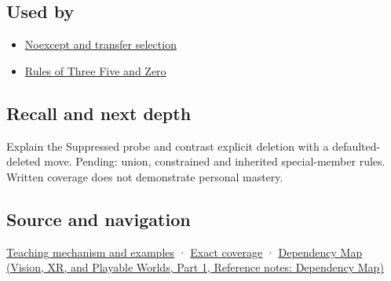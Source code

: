 \subsection{Used by}\label{appendix-42e02a12c694-used-by}

\hypertarget{appendix-42e02a12c694-used-by}{}

\begin{itemize}
\tightlist
\item
  \hyperref[appendix-c746afaa47d1]{Noexcept and transfer selection}
\item
  \hyperref[appendix-7679107d057e]{Rules of Three Five and Zero}
\end{itemize}

\subsection{Recall and next depth}\label{appendix-42e02a12c694-recall-and-next-depth}

\hypertarget{appendix-42e02a12c694-recall-and-next-depth}{}

Explain the Suppressed probe and contrast explicit deletion with a defaulted-deleted move. Pending: union, constrained and inherited special-member rules. Written coverage does not demonstrate personal mastery.

\subsection{Source and navigation}\label{appendix-42e02a12c694-source-and-navigation}

\hypertarget{appendix-42e02a12c694-source-and-navigation}{}

\hyperref[01-foundations-i-ch003-let-the-compiler-compose-the-operations]{Teaching mechanism and examples} · \hyperref[appendix-fd090d982a15-m009---parts-127-147]{Exact coverage} · \href{../07-Vision-XR-and-Playable-Worlds-P01/main.pdf\#nameddest=appendix-4ad47bdd269a}{Dependency Map (Vision, XR, and Playable Worlds, Part 1, Reference notes: Dependency Map)}
